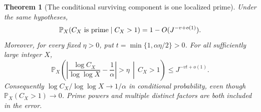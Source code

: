\documentclass[11pt]{article}
\newtheorem{theorem}{Theorem}[section]
\theoremstyle{definition}
\begin{document}
\begin{theorem}[The conditional surviving component is one localized prime]
\label{thm:conditional-thin-single-prime-localization}
Under the same hypotheses,
\begin{equation}
 \mathbb P_X(C_X\ {\rm is\ prime}\mid C_X>1)
       =1-O(J^{-v+o(1)}).
 \label{eq:conditional-thin-single-prime}
\end{equation}
Moreover, for every fixed $\eta>0$, put
$t=\min\{1,\alpha\eta/2\}>0$.
For all sufficiently large integer $X$,
\begin{equation}
 \mathbb P_X\left(
 \left|\frac{\log C_X}{\log\log X}-\frac1\alpha\right|>\eta
                 \,\middle|\, C_X>1\right)
       \le J^{-vt+o(1)}.
 \label{eq:conditional-thin-prime-size}
\end{equation}
Consequently $\log C_X/\log\log X\to1/\alpha$
in conditional probability, even though
$\mathbb P_X(C_X>1)\to0$.
Prime powers and multiple distinct factors are both included
in the error.
\end{theorem}
\end{document}
